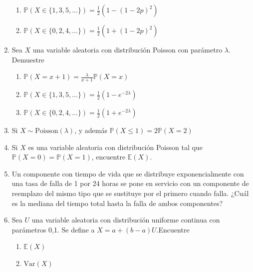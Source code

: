 \documentclass[11pt,a4paper]{report}
\begin{document}
\begin{enumerate}
{\begin{enumerate}
				\item {
					$\mathbb{P}(X \in \{ 1,3,5,...\}) = \frac{1}{2}
					 (1 - (1 - 2p)^2)$
				}

				\item {
					$\mathbb{P}(X \in \{ 0,2,4,...\}) = \frac{1}{2}
					 (1 + (1 - 2p)^2)$
				}
			\end{enumerate}
		}

		\item{
		Sea $X$ una variable aleatoria con distribución Poisson con parámetro
		$\lambda$. Demuestre
			\begin{enumerate}
				\item {
					$\mathbb{P}(X = x + 1) = \frac{\lambda}{x + 1}
					 \mathbb{P}(X = x)$
				}

				\item {
					$\mathbb{P}(X \in \{ 1,3,5,...\}) = \frac{1}{2}
					 (1 - e^{-2\lambda})$
				}

				\item {
					$\mathbb{P}(X \in \{ 0,2,4,...\}) = \frac{1}{2}
					 (1 + e^{-2\lambda})$
				}
			\end{enumerate}
		}

		\item{
			Si $X \sim \text{Poisson}(\lambda)$, y además $\mathbb{P}(X \leq 1)
			= 2\mathbb{P}(X = 2)$
		}

		\item{
			Si $X$ es una variable aleatoria con distribución Poisson tal que
			$\mathbb{P}(X = 0) = \mathbb{P}(X = 1)$, encuentre $\mathbb{E}(X)$.
		}

		\item{
			Un componente con tiempo de vida que se distribuye exponencialmente
			con una tasa de falla de 1 por 24 horas se pone en servicio con un
			componente de reemplazo del mismo tipo que se sustituye por el
			primero cuando falla. ¿Cuál es la mediana del tiempo total hasta la
			falla de ambos componentes?
		}

		\item{
			Sea $U$ una variable aleatoria con distribución uniforme continua
			con parámetros 0,1. Se define a $X = a+(b - a)U$.Encuentre
			\begin{enumerate}
				\item {
					$\mathbb{E}(X)$
				}

				\item {
					$\text{Var}(X)$
				}
			\end{enumerate}

		}

	\end{enumerate}
\end{document}
